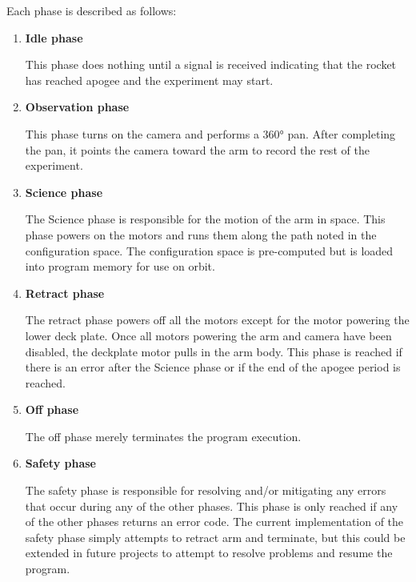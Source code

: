 Each phase is described as follows:
\begin{enumerate}
	\item{\textbf{Idle phase}}

	This phase does nothing until a signal is received indicating that the
	rocket has reached \gls{apogee} and the experiment may start.

	\item{\textbf{Observation phase}}

	This phase turns on the camera and performs a 360° pan.
	After completing the pan, it points the camera toward the arm to record the
	rest of the experiment.

	\item{\textbf{Science phase}}

	The Science phase is responsible for the motion of the arm in space.
	This phase powers on the motors and runs them along the path noted in the configuration 
	space. The configuration space is pre-computed but is loaded into program memory for use on 
	orbit.

	\item{\textbf{Retract phase}}

	The retract phase powers off all the motors except for the motor powering the lower deck plate. Once all motors powering the arm
	and camera have been disabled, the deckplate motor pulls in the arm body. This phase is reached if there is an error after the 
	Science phase or if the end of the \gls{apogee} period is reached.

	\item{\textbf{Off phase}}

	The off phase merely terminates the program execution.

	\item{\textbf{Safety phase}}

	The safety phase is responsible for resolving and/or mitigating any errors
	that occur during any of the other phases.
	This phase is only reached if any of the other phases returns an error
	code.
	The current implementation of the safety phase simply attempts to retract
	arm and terminate, but this could be extended in future projects to attempt to resolve
	problems and resume the program.
\end{enumerate}

